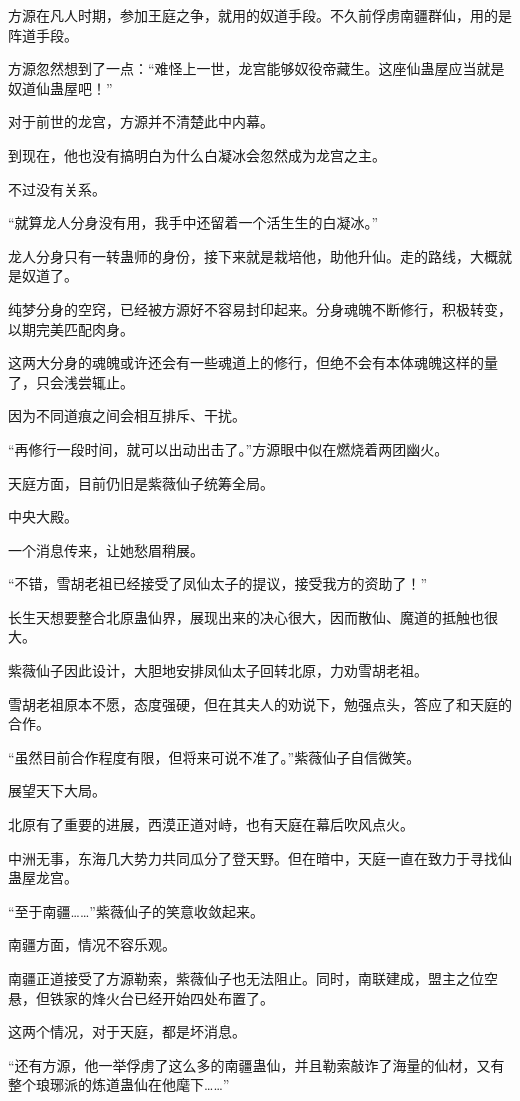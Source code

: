 \begin{this_body}
方源在凡人时期，参加王庭之争，就用的奴道手段。不久前俘虏南疆群仙，用的是阵道手段。

方源忽然想到了一点：“难怪上一世，龙宫能够奴役帝藏生。这座仙蛊屋应当就是奴道仙蛊屋吧！”

对于前世的龙宫，方源并不清楚此中内幕。

到现在，他也没有搞明白为什么白凝冰会忽然成为龙宫之主。

不过没有关系。

“就算龙人分身没有用，我手中还留着一个活生生的白凝冰。”

龙人分身只有一转蛊师的身份，接下来就是栽培他，助他升仙。走的路线，大概就是奴道了。

纯梦分身的空窍，已经被方源好不容易封印起来。分身魂魄不断修行，积极转变，以期完美匹配肉身。

这两大分身的魂魄或许还会有一些魂道上的修行，但绝不会有本体魂魄这样的量了，只会浅尝辄止。

因为不同道痕之间会相互排斥、干扰。

“再修行一段时间，就可以出动出击了。”方源眼中似在燃烧着两团幽火。

天庭方面，目前仍旧是紫薇仙子统筹全局。

中央大殿。

一个消息传来，让她愁眉稍展。

“不错，雪胡老祖已经接受了凤仙太子的提议，接受我方的资助了！”

长生天想要整合北原蛊仙界，展现出来的决心很大，因而散仙、魔道的抵触也很大。

紫薇仙子因此设计，大胆地安排凤仙太子回转北原，力劝雪胡老祖。

雪胡老祖原本不愿，态度强硬，但在其夫人的劝说下，勉强点头，答应了和天庭的合作。

“虽然目前合作程度有限，但将来可说不准了。”紫薇仙子自信微笑。

展望天下大局。

北原有了重要的进展，西漠正道对峙，也有天庭在幕后吹风点火。

中洲无事，东海几大势力共同瓜分了登天野。但在暗中，天庭一直在致力于寻找仙蛊屋龙宫。

“至于南疆……”紫薇仙子的笑意收敛起来。

南疆方面，情况不容乐观。

南疆正道接受了方源勒索，紫薇仙子也无法阻止。同时，南联建成，盟主之位空悬，但铁家的烽火台已经开始四处布置了。

这两个情况，对于天庭，都是坏消息。

“还有方源，他一举俘虏了这么多的南疆蛊仙，并且勒索敲诈了海量的仙材，又有整个琅琊派的炼道蛊仙在他麾下……”


\end{this_body}
